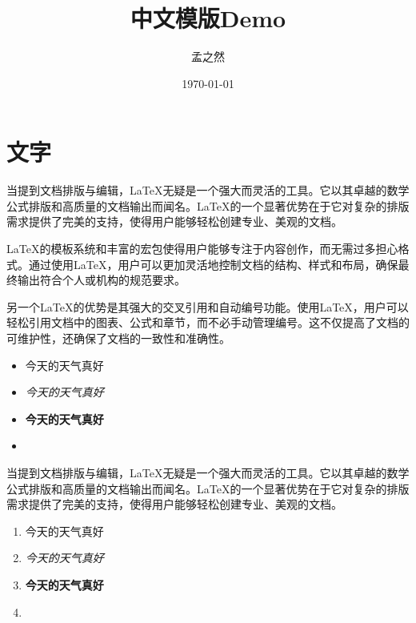 \documentclass[AutoFakeBold,a4paper]{ctexart}
\title{\textbf{中文模版Demo}}
\author{孟之然}
\date{\today}
\begin{document}
\tableofcontents

\thispagestyle{empty}

\newpage

\setcounter{page}{1}

\maketitle

\thispagestyle{fancy}


\section{文字}

当提到文档排版与编辑\cite{bhagat2017,bittencourt2022,brennan2017,doblhofer2015}，LaTeX无疑是一个强大而灵活的工具。它以其卓越的数学公式排版和高质量的文档输出而闻名。LaTeX的一个显著优势在于它对复杂的排版需求提供了完美的支持，使得用户能够轻松创建专业、美观的文档。

LaTeX的模板系统和丰富的宏包使得用户能够专注于内容创作，而无需过多担心格式。通过使用LaTeX，用户可以更加灵活地控制文档的结构、样式和布局，确保最终输出符合个人或机构的规范要求。

另一个LaTeX的优势是其强大的交叉引用和自动编号功能。使用LaTeX，用户可以轻松引用文档中的图表、公式和章节，而不必手动管理编号。这不仅提高了文档的可维护性，还确保了文档的一致性和准确性。



\begin{itemize}
    \item 今天的天气真好
    \item \emph{今天的天气真好}
    \item \textbf{今天的天气真好}
    \item {}
\end{itemize}


当提到文档排版与编辑，LaTeX无疑是一个强大而灵活的工具。它以其卓越的数学公式排版和高质量的文档输出而闻名。LaTeX的一个显著优势在于它对复杂的排版需求提供了完美的支持，使得用户能够轻松创建专业、美观的文档。


\begin{enumerate}
    \item 今天的天气真好
    \item \emph{今天的天气真好}
    \item \textbf{今天的天气真好}
    \item {}
\end{enumerate}
\end{document}
